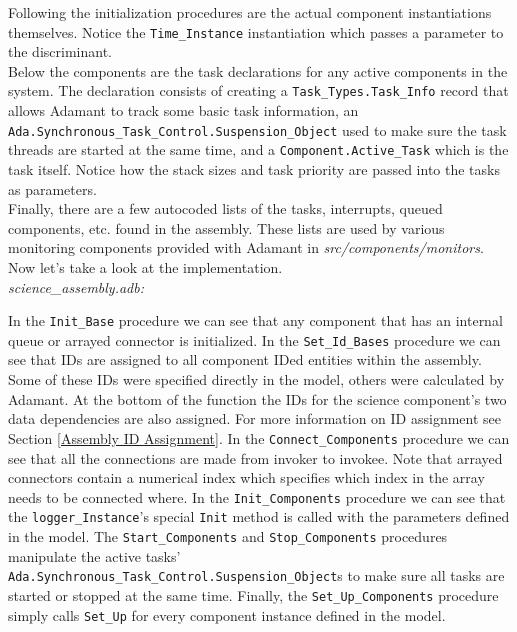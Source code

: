 Following the initialization procedures are the actual component instantiations themselves. Notice the \texttt{Time\_Instance} instantiation which passes a parameter to the discriminant. \\

Below the components are the task declarations for any active components in the system. The declaration consists of creating a \texttt{Task\_Types.Task\_Info} record that allows Adamant to track some basic task information, an \texttt{Ada.Synchronous\_Task\_Control.Suspension\_Object} used to make sure the task threads are started at the same time, and a \texttt{Component.Active\_Task} which is the task itself. Notice how the stack sizes and task priority are passed into the tasks as parameters. \\

Finally, there are a few autocoded lists of the tasks, interrupts, queued components, etc. found in the assembly. These lists are used by various monitoring components provided with Adamant in \textit{src/components/monitors}. \\

Now let's take a look at the implementation. \\

\textit{science\_assembly.adb:}

In the \texttt{Init\_Base} procedure we can see that any component that has an internal queue or arrayed connector is initialized. In the \texttt{Set\_Id\_Bases} procedure we can see that IDs are assigned to all component IDed entities within the assembly. Some of these IDs were specified directly in the model, others were calculated by Adamant. At the bottom of the function the IDs for the science component's two data dependencies are also assigned. For more information on ID assignment see Section \ref{Assembly ID Assignment}. In the \texttt{Connect\_Components} procedure we can see that all the connections are made from invoker to invokee. Note that arrayed connectors contain a numerical index which specifies which index in the array needs to be connected where. In the \texttt{Init\_Components} procedure we can see that the \texttt{logger\_Instance}'s special \texttt{Init} method is called with the parameters defined in the model. The \texttt{Start\_Components} and \texttt{Stop\_Components} procedures manipulate the active tasks' \texttt{Ada.Synchronous\_Task\_Control.Suspension\_Object}s to make sure all tasks are started or stopped at the same time. Finally, the \texttt{Set\_Up\_Components} procedure simply calls \texttt{Set\_Up} for every component instance defined in the model. \\

